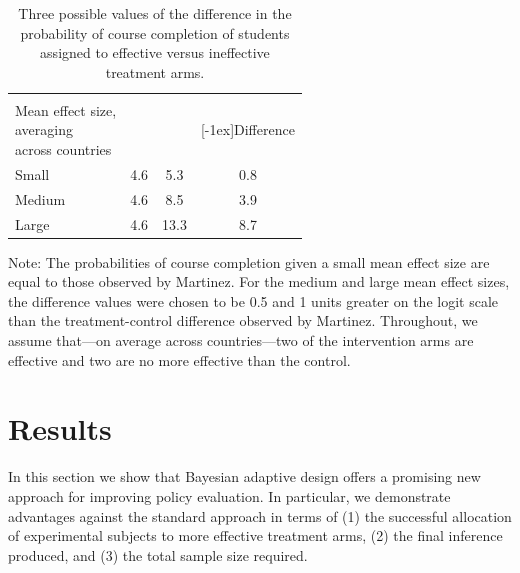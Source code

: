 \documentclass{acm_proc_article-sp}
\begin{document}
\begin{table}[! htbp]\captionsetup{font=bf}
  \centering\setlength\tabcolsep{8pt}
  \caption{Three possible values of the difference in the probability of course completion of students assigned to effective versus ineffective treatment arms.}
  \label{my-label}
  \begin{tabularx}{\linewidth}{XSS[table-format=2.1]S}
    & 
    & \\
    \cmidrule(lr){2-3}
    [0.3ex]{Mean effect size, \\averaging\\ across countries}& {} & {} & {[-1ex]{Difference}}
    \\[-1.4ex]
    \midrule
    Small & 4.6 & 5.3 & 0.8 \\
    Medium & 4.6 & 8.5 & 3.9 \\
    Large & 4.6 & 13.3 & 8.7
  \end{tabularx}
\begin{flushleft}
{\footnotesize{Note: The probabilities of course completion given a small mean effect size are equal to those observed by Martinez. For the medium and large mean effect sizes, the difference values were chosen to be 0.5 and 1 units greater on the logit scale than the treatment-control difference observed by Martinez. Throughout, we assume that---on average across countries---two of the intervention arms are effective and two are no more effective than the control.}}
\end{flushleft}    
\end{table}

\section{Results}
In this section we show that Bayesian adaptive design offers a promising new approach for improving policy evaluation. 
In particular, we demonstrate advantages against the standard approach in terms of (1) the successful allocation of experimental subjects to more effective treatment arms, (2) the final inference produced, and (3) the total sample size required. 
\end{document}
